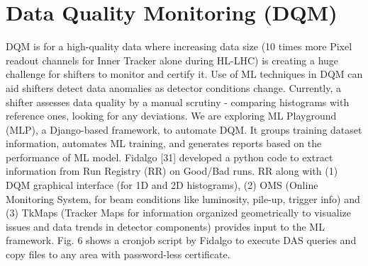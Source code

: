 \chapter{Data Quality Monitoring (DQM) \label{ch:DQM}}
DQM is for a high-quality data where increasing data size (10 times more Pixel readout channels for Inner Tracker alone during HL-LHC) is creating a huge challenge for shifters to monitor and certify it.  Use of ML techniques in DQM can aid shifters detect data anomalies as detector conditions change. Currently, a shifter assesses data quality by a manual scrutiny - comparing histograms with reference ones, looking for any deviations.
We are exploring ML Playground (MLP), a Django-based framework, to automate DQM. It groups training dataset information, automates ML training, and generates reports based on the performance of ML model.
Fidalgo [31] developed a python code to extract information from Run Registry (RR) on Good/Bad runs. RR along with (1) DQM graphical interface (for 1D and 2D histograms), (2) OMS (Online Monitoring System, for beam conditions like luminosity, pile-up, trigger info) and (3) TkMaps (Tracker Maps for information organized geometrically to visualize issues and data trends in detector components) provides input to the ML framework. Fig. 6 shows a cronjob script by Fidalgo to execute DAS queries and copy files to any area with password-less certificate.


